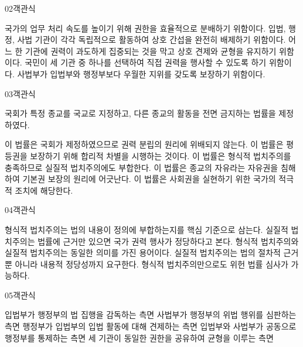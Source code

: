 \documentclass[fs85,seriesWit]{korfarm-base}
\begin{document}
\begin{kfQBlock}{02}{객관식}
\begin{kfChoices}
\kfChoice 국가의 업무 처리 속도를 높이기 위해 권한을 효율적으로 분배하기 위함이다.
\kfChoice 입법, 행정, 사법 기관이 각각 독립적으로 활동하여 상호 간섭을 완전히 배제하기 위함이다.
\kfChoice 어느 한 기관에 권력이 과도하게 집중되는 것을 막고 상호 견제와 균형을 유지하기 위함이다.
\kfChoice 국민이 세 기관 중 하나를 선택하여 직접 권력을 행사할 수 있도록 하기 위함이다.
\kfChoice 사법부가 입법부와 행정부보다 우월한 지위를 갖도록 보장하기 위함이다.
\end{kfChoices}
\end{kfQBlock}

\begin{kfQBlock}{03}{객관식}
\begin{kfEvidence}국회가 특정 종교를 국교로 지정하고, 다른 종교의 활동을 전면 금지하는 법률을 제정하였다.\end{kfEvidence}
\begin{kfChoices}
\kfChoice 이 법률은 국회가 제정하였으므로 권력 분립의 원리에 위배되지 않는다.
\kfChoice 이 법률은 평등권을 보장하기 위해 합리적 차별을 시행하는 것이다.
\kfChoice 이 법률은 형식적 법치주의를 충족하므로 실질적 법치주의에도 부합한다.
\kfChoice 이 법률은 종교의 자유라는 자유권을 침해하여 기본권 보장의 원리에 어긋난다.
\kfChoice 이 법률은 사회권을 실현하기 위한 국가의 적극적 조치에 해당한다.
\end{kfChoices}
\end{kfQBlock}

\begin{kfQBlock}{04}{객관식}
\begin{kfChoices}
\kfChoice 형식적 법치주의는 법의 내용이 정의에 부합하는지를 핵심 기준으로 삼는다.
\kfChoice 실질적 법치주의는 법률에 근거만 있으면 국가 권력 행사가 정당하다고 본다.
\kfChoice 형식적 법치주의와 실질적 법치주의는 동일한 의미를 가진 용어이다.
\kfChoice 실질적 법치주의는 법의 절차적 근거뿐 아니라 내용적 정당성까지 요구한다.
\kfChoice 형식적 법치주의만으로도 위헌 법률 심사가 가능하다.
\end{kfChoices}
\end{kfQBlock}

\begin{kfQBlock}{05}{객관식}
\begin{kfChoices}
\kfChoice 입법부가 행정부의 법 집행을 감독하는 측면
\kfChoice 사법부가 행정부의 위법 행위를 심판하는 측면
\kfChoice 행정부가 입법부의 입법 활동에 대해 견제하는 측면
\kfChoice 입법부와 사법부가 공동으로 행정부를 통제하는 측면
\kfChoice 세 기관이 동일한 권한을 공유하여 균형을 이루는 측면
\end{kfChoices}
\end{kfQBlock}
\end{document}
